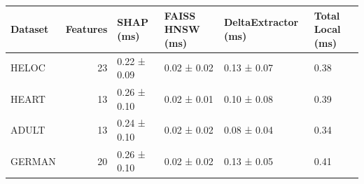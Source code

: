 \begin{tabular}{lrllll}
\toprule
Dataset & Features & SHAP (ms) & FAISS HNSW (ms) & DeltaExtractor (ms) & Total Local (ms) \\
\midrule
HELOC & 23 & 0.22 ± 0.09 & 0.02 ± 0.02 & 0.13 ± 0.07 & 0.38 \\
HEART & 13 & 0.26 ± 0.10 & 0.02 ± 0.01 & 0.10 ± 0.08 & 0.39 \\
ADULT & 13 & 0.24 ± 0.10 & 0.02 ± 0.02 & 0.08 ± 0.04 & 0.34 \\
GERMAN & 20 & 0.26 ± 0.10 & 0.02 ± 0.02 & 0.13 ± 0.05 & 0.41 \\
\bottomrule
\end{tabular}
